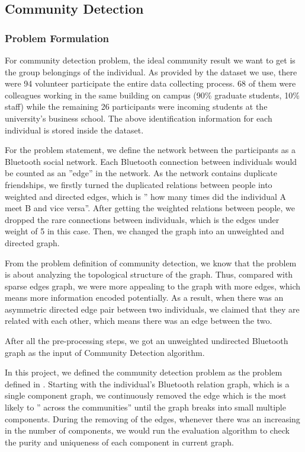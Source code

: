 \documentclass[11pt]{article}
\begin{document}
\subsection{Community Detection}

\subsubsection{Problem Formulation}
For community detection problem, the ideal community result we want to get is the group belongings of the individual. As provided by the dataset we use, there were 94 volunteer participate the entire data collecting process. 68 of them were colleagues working in the same building on campus (90\% graduate students, 10\% staff) while the remaining 26 participants were incoming students at the university’s business school. The above identification information for each individual is stored inside the dataset.

For the problem statement, we define the network between the participants as a Bluetooth social network. Each  Bluetooth connection between individuals would be counted as an ''edge'' in the network. As the network contains duplicate friendships, we firstly turned the duplicated relations between people into weighted and directed edges, which is '' how many times did the individual A meet B and vice versa''.  After getting the weighted relations between people, we dropped the rare connections between individuals, which is the edges under weight of 5 in this case. Then, we changed the graph into an unweighted and directed graph.

From the problem definition of community detection, we know that the problem is about analyzing the topological structure of the graph. Thus, compared with sparse edges graph, we were more appealing to the graph with more edges, which means more information encoded potentially. As a result, when there was an asymmetric directed edge pair between two individuals, we claimed that they are related with each other, which means there was an edge between the two.

After all the pre-processing steps, we got an unweighted undirected Bluetooth graph as the input of Community Detection algorithm.

In this project, we defined the community detection problem as the problem defined in \cite{girvan_community_2002}. Starting with the individual's Bluetooth relation graph, which is a single component graph, we continuously removed the edge which is the most likely to '' across the communities'' until the graph breaks into small multiple components. During the removing of the edges, whenever there was an increasing in the number of components, we would run the evaluation algorithm to check the purity and uniqueness of each component in current graph.
\end{document}
